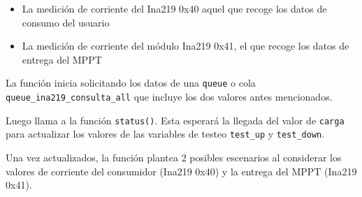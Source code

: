                     \begin{itemize} [label=•]
                        \setlength{\itemindent}{1.5em}
                        
                        \item La medición de corriente del Ina219 0x40 aquel que recoge los datos de consumo del usuario
                        \item La medición de corriente del módulo Ina219 0x41, el que recoge los datos de entrega del MPPT
                    \end{itemize}
                    
                    La función inicia solicitando los datos de una \texttt{queue} o cola \texttt{queue\_ina219\_consulta\_all} que incluye los dos valores antes mencionados.\par
                    \par
                    Luego llama a la función \texttt{status()}. Esta esperará la llegada del valor de \texttt{carga} para actualizar los valores de las variables de testeo \texttt{test\_up} y \texttt{test\_down}.\par
                    Una vez actualizados, la función plantea 2 posibles escenarios al considerar los valores de corriente del consumidor (Ina219 0x40) y la entrega del MPPT (Ina219 0x41).\par
